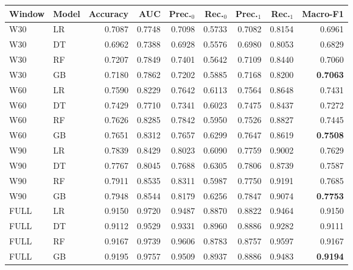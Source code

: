 \small
\setlength{\tabcolsep}{4pt}
\begin{tabular}{@{}llrrrrrrr@{}}
\toprule
Window & Model & Accuracy & AUC & Prec.$_0$ & Rec.$_0$ & Prec.$_1$ & Rec.$_1$ & Macro-F1 \\
\midrule
W30 & LR & 0.7087 & 0.7748 & 0.7098 & 0.5733 & 0.7082 & 0.8154 & 0.6961 \\
W30 & DT & 0.6962 & 0.7388 & 0.6928 & 0.5576 & 0.6980 & 0.8053 & 0.6829 \\
W30 & RF & 0.7207 & 0.7849 & 0.7401 & 0.5642 & 0.7109 & 0.8440 & 0.7060 \\
W30 & GB & 0.7180 & 0.7862 & 0.7202 & 0.5885 & 0.7168 & 0.8200 & \textbf{0.7063} \\
W60 & LR & 0.7590 & 0.8229 & 0.7642 & 0.6113 & 0.7564 & 0.8648 & 0.7431 \\
W60 & DT & 0.7429 & 0.7710 & 0.7341 & 0.6023 & 0.7475 & 0.8437 & 0.7272 \\
W60 & RF & 0.7626 & 0.8285 & 0.7842 & 0.5950 & 0.7526 & 0.8827 & 0.7445 \\
W60 & GB & 0.7651 & 0.8312 & 0.7657 & 0.6299 & 0.7647 & 0.8619 & \textbf{0.7508} \\
W90 & LR & 0.7839 & 0.8429 & 0.8023 & 0.6090 & 0.7759 & 0.9002 & 0.7629 \\
W90 & DT & 0.7767 & 0.8045 & 0.7688 & 0.6305 & 0.7806 & 0.8739 & 0.7587 \\
W90 & RF & 0.7911 & 0.8535 & 0.8311 & 0.5987 & 0.7750 & 0.9191 & 0.7685 \\
W90 & GB & 0.7948 & 0.8544 & 0.8179 & 0.6256 & 0.7847 & 0.9074 & \textbf{0.7753} \\
FULL & LR & 0.9150 & 0.9720 & 0.9487 & 0.8870 & 0.8822 & 0.9464 & 0.9150 \\
FULL & DT & 0.9112 & 0.9529 & 0.9331 & 0.8960 & 0.8886 & 0.9282 & 0.9111 \\
FULL & RF & 0.9167 & 0.9739 & 0.9606 & 0.8783 & 0.8757 & 0.9597 & 0.9167 \\
FULL & GB & 0.9195 & 0.9757 & 0.9509 & 0.8937 & 0.8886 & 0.9483 & \textbf{0.9194} \\
\bottomrule
\end{tabular}
